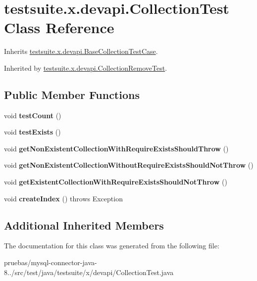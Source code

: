 \hypertarget{classtestsuite_1_1x_1_1devapi_1_1_collection_test}{}\section{testsuite.\+x.\+devapi.\+Collection\+Test Class Reference}
\label{classtestsuite_1_1x_1_1devapi_1_1_collection_test}


Inherits \mbox{\hyperlink{classtestsuite_1_1x_1_1devapi_1_1_base_collection_test_case}{testsuite.\+x.\+devapi.\+Base\+Collection\+Test\+Case}}.



Inherited by \mbox{\hyperlink{classtestsuite_1_1x_1_1devapi_1_1_collection_remove_test}{testsuite.\+x.\+devapi.\+Collection\+Remove\+Test}}.

\subsection*{Public Member Functions}
\begin{DoxyCompactItemize}
\item 
\mbox{\label{classtestsuite_1_1x_1_1devapi_1_1_collection_test_a0c5927a5c09f384ad58e21aad4338fb4}} 
void {\bfseries test\+Count} ()
\item 
\mbox{\label{classtestsuite_1_1x_1_1devapi_1_1_collection_test_acf8ab67b83a44279bfa89d3b2b718545}} 
void {\bfseries test\+Exists} ()
\item 
\mbox{\label{classtestsuite_1_1x_1_1devapi_1_1_collection_test_a9e40f1bb484f3441ad46481743b65113}} 
void {\bfseries get\+Non\+Existent\+Collection\+With\+Require\+Exists\+Should\+Throw} ()
\item 
\mbox{\label{classtestsuite_1_1x_1_1devapi_1_1_collection_test_aeb9b2b6d6f0d341c3d672248be38566c}} 
void {\bfseries get\+Non\+Existent\+Collection\+Without\+Require\+Exists\+Should\+Not\+Throw} ()
\item 
\mbox{\label{classtestsuite_1_1x_1_1devapi_1_1_collection_test_ab364d42cc7b9b7fc36f93f3492ea6b92}} 
void {\bfseries get\+Existent\+Collection\+With\+Require\+Exists\+Should\+Not\+Throw} ()
\item 
\mbox{\label{classtestsuite_1_1x_1_1devapi_1_1_collection_test_a44d15ced6846706f7e3f1b1ae7bb8e97}} 
void {\bfseries create\+Index} ()  throws Exception 
\end{DoxyCompactItemize}
\subsection*{Additional Inherited Members}


The documentation for this class was generated from the following file\+:\begin{DoxyCompactItemize}
\item 
pruebas/mysql-\/connector-\/java-\/8../src/test/java/testsuite/x/devapi/Collection\+Test.\+java\end{DoxyCompactItemize}
